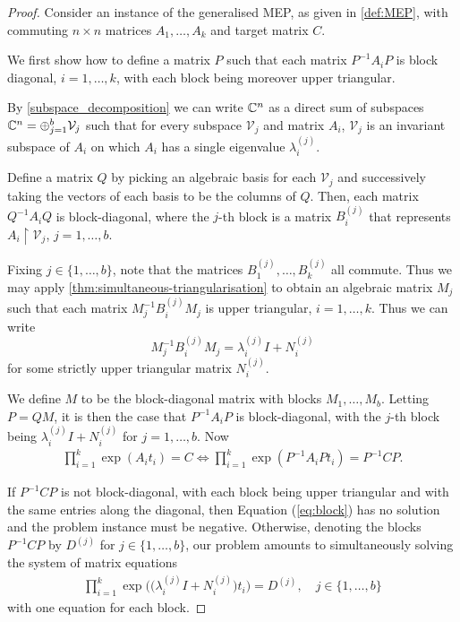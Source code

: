 \begin{proof}
  Consider an instance of the generalised MEP, as given in \cref{def:MEP},
  with commuting $n\times n$ matrices $A_1,\ldots,A_k$ and target
  matrix $C$.

  We first show how to define a matrix $P$ such that each matrix
  $P^{-1} A_{i} P$ is block diagonal, $i=1,\ldots,k$, with each block
  being moreover upper triangular.

  By \cref{subspace_decomposition} we can write $\mathbb{C}^n$
  as a direct sum of subspaces $\mathbb{C}^n = \oplus_{j=1}^b \mathcal{V}_j$
  such that for every subspace $\mathcal{V}_j$ and matrix $A_i$, $\mathcal{V}_j$ is an
  invariant subspace of $A_i$ on which $A_i$ has a single eigenvalue
  $\lambda_i^{(j)}$.

  Define a matrix $Q$ by picking an algebraic basis for each
  $\mathcal{V}_j$ and successively taking the vectors of each basis to
  be the columns of $Q$. Then, each matrix $Q^{-1} A_{i} Q$ is
  block-diagonal, where the $j$-th block is a matrix $B^{(j)}_i$ that
  represents $A_{i} \restriction{\mathcal{V}_j}$, $j=1,\ldots,b$.

  Fixing $j\in \lbrace 1,\ldots,b \rbrace$, note that the
  matrices $B_1^{(j)},\ldots,B_k^{(j)}$ all commute.  Thus we
  may apply \cref{thm:simultaneous-triangularisation} to obtain an
  algebraic matrix $M_j$ such that each matrix $M_j^{-1} B^{(j)}_{i} M_j$
  is upper triangular, $i=1,\ldots,k$.  Thus we can write
  \[ M_j^{-1} B^{(j)}_{i} M_j = \lambda_i^{(j)}I + N_i^{(j)} \]
  for some strictly upper triangular matrix $ N_i^{(j)}$.

  We define $M$ to be the block-diagonal matrix with blocks $M_1,\ldots,M_b$.
  Letting $P=QM$, it is then the case
  that $P^{-1} A_{i} P$ is block-diagonal, with the $j$-th block being
  $\lambda_i^{(j)}I + N_i^{(j)}$ for $j=1,\ldots,b$.  Now
\begin{align}
\prod \limits_{i=1}^{k} \exp(A_{i} t_{i}) = C \Leftrightarrow \prod \limits_{i=1}^{k} \exp(P^{-1}A_{i}P t_{i}) = P^{-1}CP .
\label{eq:block}
\end{align}

If $P^{-1}CP$ is not block-diagonal, with each block being upper
triangular and with the same entries along the diagonal, then Equation
(\ref{eq:block}) has no solution and the problem instance must be
negative. Otherwise, denoting the blocks $P^{-1}CP$ by $D^{(j)}$ for
$j \in \lbrace 1, \ldots, b \rbrace$, our problem amounts to
simultaneously solving the system of matrix equations
\begin{align}
\prod\limits_{i=1}^{k} \exp\big(\big(\lambda_i^{(j)}I + N_i^{(j)}\big)t_{i}\big) = D^{(j)}, \quad j \in \lbrace 1, \ldots, b \rbrace
\label{eq:main1}
\end{align}
with one equation for each block.


\end{proof}
